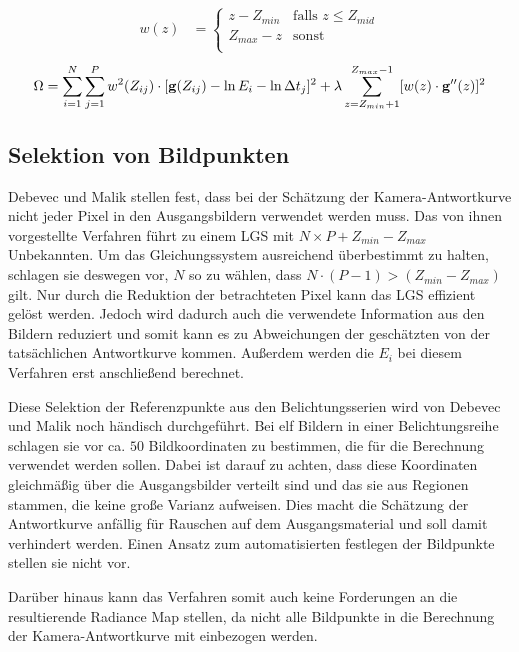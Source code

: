 \begin{align}
\label{eq:w}
w(z) &= \begin{cases} 
z - Z_{min}&  \text{falls } z \leq Z_{mid}  \\ 
Z_{max}-z& \text{sonst}\\
\end{cases}
\end{align}
\begin{equation}
\label{eq:energy:weights}
\Omega = \sum \limits_{i=1}^{N} \sum \limits_{j=1}^{P}w^2(Z_{ij})\cdot[\mathbf g(Z_{ij}) - \ln E_i - \ln \Delta t_j]^2 + \lambda  \sum \limits_{z=Z_{min}+1}^{Z_{max}-1} [w(z) \cdot \mathbf{g}''(z)]^2\\
\end{equation}

\subsection{Selektion von Bildpunkten}
\label{algo:schwachstellen:selektion}
Debevec und Malik stellen fest, dass bei der Schätzung der Kamera-Antwortkurve nicht jeder Pixel in den Ausgangsbildern verwendet werden muss. Das von ihnen vorgestellte Verfahren führt zu einem \gls{LGS} mit $N \times P + Z_{min} - Z_{max}$ Unbekannten. Um das Gleichungssystem ausreichend überbestimmt zu halten, schlagen sie deswegen vor, $N$ so zu wählen, dass $N\cdot(P-1) > (Z_{min}-Z_{max})$ gilt. Nur durch die Reduktion der betrachteten Pixel kann das \gls{LGS} effizient gelöst werden. Jedoch wird dadurch auch die verwendete Information aus den Bildern reduziert und somit kann es zu Abweichungen der geschätzten von der tatsächlichen Antwortkurve kommen. Außerdem werden die $E_i$ bei diesem Verfahren erst anschließend berechnet.

Diese Selektion der Referenzpunkte aus den Belichtungsserien wird von Debevec und Malik noch händisch durchgeführt. Bei elf Bildern in einer Belichtungsreihe schlagen sie vor ca. $50$ Bildkoordinaten zu bestimmen, die für die Berechnung verwendet werden sollen. Dabei ist darauf zu achten, dass diese Koordinaten gleichmäßig über die Ausgangsbilder verteilt sind und das sie aus Regionen stammen, die keine große Varianz aufweisen. Dies macht die Schätzung der Antwortkurve anfällig für Rauschen auf dem Ausgangsmaterial und soll damit verhindert werden. Einen Ansatz zum automatisierten festlegen der Bildpunkte stellen sie nicht vor.

Darüber hinaus kann das Verfahren somit auch keine Forderungen an die resultierende \gls{Radiance Map} stellen, da nicht alle Bildpunkte in die Berechnung der Kamera-Antwortkurve mit einbezogen werden. 

